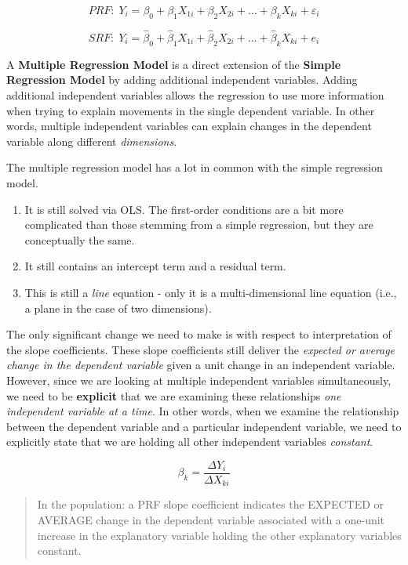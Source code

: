 \documentclass[
]{book}
\begin{document}
\[PRF:\;Y_i=\beta_0+\beta_1X_{1i}+\beta_2X_{2i}+...+\beta_kX_{ki}+\varepsilon_i\]

\[SRF:\;Y_i=\hat{\beta}_0+\hat{\beta}_1X_{1i}+\hat{\beta}_2X_{2i}+...+\hat{\beta}_kX_{ki}+e_i\]

A \textbf{Multiple Regression Model} is a direct extension of the \textbf{Simple Regression Model} by adding additional independent variables. Adding additional independent variables allows the regression to use more information when trying to explain movements in the single dependent variable. In other words, multiple independent variables can explain changes in the dependent variable along different \emph{dimensions}.

The multiple regression model has a lot in common with the simple regression model.

\begin{enumerate}
\def\labelenumi{\arabic{enumi}.}
\item
  It is still solved via OLS. The first-order conditions are a bit more complicated than those stemming from a simple regression, but they are conceptually the same.
\item
  It still contains an intercept term and a residual term.
\item
  This is still a \emph{line} equation - only it is a multi-dimensional line equation (i.e., a plane in the case of two dimensions).
\end{enumerate}

The only significant change we need to make is with respect to interpretation of the slope coefficients. These slope coefficients still deliver the \emph{expected or average change in the dependent variable} given a unit change in an independent variable. However, since we are looking at multiple independent variables simultaneously, we need to be \textbf{explicit} that we are examining these relationships \emph{one independent variable at a time}. In other words, when we examine the relationship between the dependent variable and a particular independent variable, we need to explicitly state that we are holding all other independent variables \emph{constant}.

\[\beta_k=\frac{\Delta Y_i}{\Delta X_{ki}}\]

\begin{quote}
In the population: a PRF slope coefficient indicates the EXPECTED or AVERAGE change in the dependent variable associated with a one-unit increase in the explanatory variable holding the other explanatory variables constant.
\end{quote}
\end{document}
